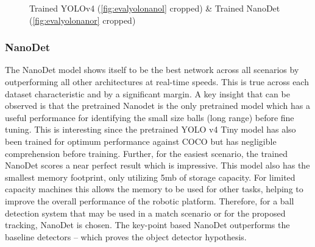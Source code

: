 \documentclass[a4paper,twoside,12pt]{report}
\begin{document}
\begin{figure}[h!]
    \centering
    \qquad
    \caption{Trained YOLOv4 (\ref{fig:evalyolonanol} cropped) \& Trained NanoDet (\ref{fig:evalyolonanor} cropped)}
\end{figure}

\subsubsection{NanoDet}

The NanoDet model shows itself to be the best network across all scenarios by outperforming all other architectures at real-time speeds. This is true across each dataset characteristic and by a significant margin. A key insight that can be observed is that the pretrained Nanodet is the only pretrained model which has a useful performance for identifying the small size balls (long range) before fine tuning. This is interesting since the pretrained YOLO v4 Tiny model has also been trained for optimum performance against COCO but has negligible comprehension before training. Further, for the easiest scenario, the trained NanoDet scores a near perfect result which is impressive. This model also has the smallest memory footprint, only utilizing 5mb of storage capacity. For limited capacity machines this allows the memory to be used for other tasks, helping to improve the overall performance of the robotic platform. Therefore, for a ball detection system that may be used in a match scenario or for the proposed tracking, NanoDet is chosen. The key-point based NanoDet outperforms the baseline detectors -- which proves the object detector hypothesis.
\end{document}

